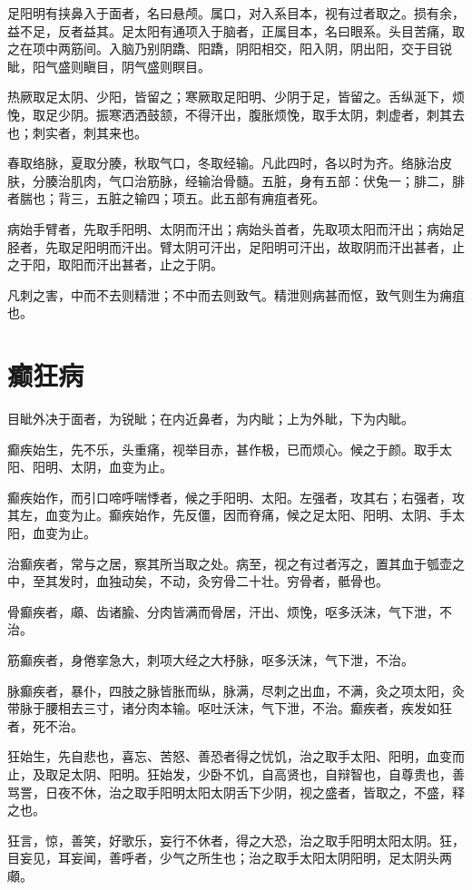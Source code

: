 \documentclass[a4paper,12pt,UTF8,twoside]{ctexbook}
\begin{document}
	足阳明有挟鼻入于面者，名曰悬颅。属口，对入系目本，视有过者取之。损有余，益不足，反者益其。足太阳有通项入于脑者，正属目本，名曰眼系。头目苦痛，取之在项中两筋间。入脑乃别阴蹻、阳蹻，阴阳相交，阳入阴，阴出阳，交于目锐眦，阳气盛则瞋目，阴气盛则瞑目。
	
	热厥取足太阴、少阳，皆留之；寒厥取足阳明、少阴于足，皆留之。舌纵涎下，烦悗，取足少阴。振寒洒洒鼓颔，不得汗出，腹胀烦悗，取手太阴，刺虚者，刺其去也；刺实者，刺其来也。
	
	春取络脉，夏取分腠，秋取气口，冬取经输。凡此四时，各以时为齐。络脉治皮肤，分腠治肌肉，气口治筋脉，经输治骨髓。五脏，身有五部：伏兔一；腓二，腓者腨也；背三，五脏之输四；项五。此五部有痈疽者死。
	
	病始手臂者，先取手阳明、太阴而汗出；病始头首者，先取项太阳而汗出；病始足胫者，先取足阳明而汗出。臂太阴可汗出，足阳明可汗出，故取阴而汗出甚者，止之于阳，取阳而汗出甚者，止之于阴。
	
	凡刺之害，中而不去则精泄；不中而去则致气。精泄则病甚而怄，致气则生为痈疽也。
	\chapter{癫狂病}
	
	目眦外决于面者，为锐眦；在内近鼻者，为内眦；上为外眦，下为内眦。
	
	癫疾始生，先不乐，头重痛，视举目赤，甚作极，已而烦心。候之于颜。取手太阳、阳明、太阴，血变为止。
	
	癫疾始作，而引口啼呼喘悸者，候之手阳明、太阳。左强者，攻其右；右强者，攻其左，血变为止。癫疾始作，先反僵，因而脊痛，候之足太阳、阳明、太阴、手太阳，血变为止。
	
	治癫疾者，常与之居，察其所当取之处。病至，视之有过者泻之，置其血于瓠壶之中，至其发时，血独动矣，不动，灸穷骨二十壮。穷骨者，骶骨也。
	
	骨癫疾者，顑、齿诸腧、分肉皆满而骨居，汗出、烦悗，呕多沃沫，气下泄，不治。
	
	筋癫疾者，身倦挛急大，刺项大经之大杼脉，呕多沃沫，气下泄，不治。
	
	脉癫疾者，暴仆，四肢之脉皆胀而纵，脉满，尽刺之出血，不满，灸之项太阳，灸带脉于腰相去三寸，诸分肉本输。呕吐沃沫，气下泄，不治。癫疾者，疾发如狂者，死不治。
	
	狂始生，先自悲也，喜忘、苦怒、善恐者得之忧饥，治之取手太阳、阳明，血变而止，及取足太阴、阳明。狂始发，少卧不饥，自高贤也，自辩智也，自尊贵也，善骂詈，日夜不休，治之取手阳明太阳太阴舌下少阴，视之盛者，皆取之，不盛，释之也。
	
	狂言，惊，善笑，好歌乐，妄行不休者，得之大恐，治之取手阳明太阳太阴。狂，目妄见，耳妄闻，善呼者，少气之所生也；治之取手太阳太阴阳明，足太阴头两顑。
	
\end{document}
